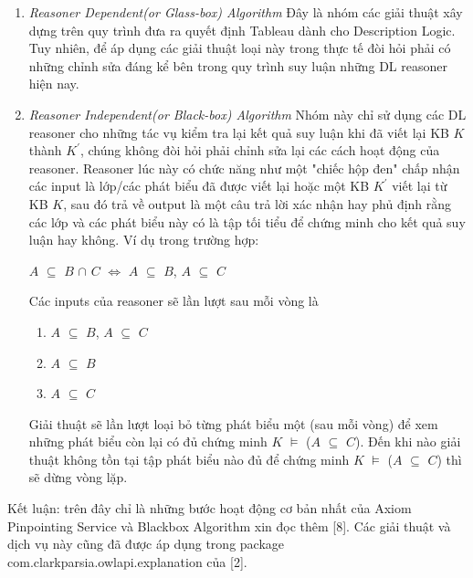 \begin{enumerate}
\item
\textit{Reasoner Dependent(or Glass-box) Algorithm} Đây là nhóm các giải thuật xây dựng trên quy trình đưa ra quyết định Tableau dành cho Description Logic. Tuy nhiên, để áp dụng các giải thuật loại này trong thực tế đòi hỏi phải có những chỉnh sửa đáng kể bên trong quy trình suy luận những DL reasoner hiện nay.
\item
\textit{Reasoner Independent(or Black-box) Algorithm} Nhóm này chỉ sử dụng các DL reasoner cho những tác vụ kiểm tra lại kết quả suy luận khi đã viết lại KB $K$ thành $K^{'}$, chúng không đòi hỏi phải chỉnh sửa lại các cách hoạt động của reasoner. Reasoner lúc này có chức năng như một "chiếc hộp đen" chấp nhận các input là lớp/các phát biểu đã được viết lại hoặc một KB $K^{'}$ viết lại từ KB $K$, sau đó trả về output là một câu trả lời xác nhận hay phủ định rằng các lớp và các phát biểu này có là tập tối tiểu để chứng minh cho kết quả suy luận hay không. Ví dụ trong trường hợp:
\begin{center}
$A$ $\subseteq$ $B$ $\cap$ $C$ $\Leftrightarrow$ $A$ $\subseteq$ $B$, $A$ $\subseteq$ $C$
\end{center}
Các inputs của reasoner sẽ lần lượt sau mỗi vòng là 
\begin{enumerate}
\item
$A$ $\subseteq$ $B$, $A$ $\subseteq$ $C$
\item
$A$ $\subseteq$ $B$
\item
$A$ $\subseteq$ $C$
\end{enumerate}
Giải thuật sẽ lần lượt loại bỏ từng phát biểu một (sau mỗi vòng) để xem những phát biểu còn lại có đủ chứng minh  $K$ $\models$ ($A$ $\subseteq$ $C$). Đến khi nào giải thuật không tồn tại tập phát biểu nào đủ để chứng minh $K$ $\models$ ($A$ $\subseteq$ $C$) thì sẽ dừng vòng lặp.
\end{enumerate}
Kết luận: trên đây chỉ là những bước hoạt động cơ bản nhất của Axiom Pinpointing Service và Blackbox Algorithm xin đọc thêm [8]. Các giải thuật và dịch vụ này cũng đã được áp dụng trong package  com.clarkparsia.owlapi.explanation của [2].
